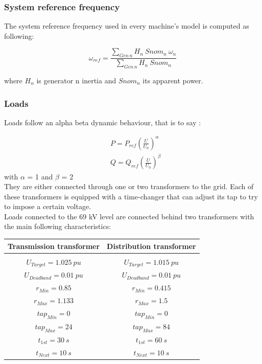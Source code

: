 \documentclass[a4paper, 12pt]{report}
\begin{document}
\subsubsection{System reference frequency}

The system reference frequency used in every machine's model is computed as following:

\[
 \omega_{ref} = \frac{\sum_{Gen \hspace{2pt} n} H_{n} \ Snom_{n} \ \omega_{n}}{\sum_{Gen \hspace{2pt} n} H_{n} \ Snom_{n}}
\]

where $H_{n}$ is generator n inertia and $Snom_{n}$ its apparent power.
\subsubsection{Loads}

Loads follow an alpha beta dynamic behaviour, that is to say :

\[
\begin{aligned}
& P = P_{ref} (\frac{U}{U_{0}})^\alpha \\
& Q = Q_{ref} (\frac{U}{U_{0}})^\beta
\end{aligned}
\]
with $\alpha$ = 1 and $\beta$ = 2 \\

They are either connected through one or two transformers to the grid. Each of these transformers is equipped with a time-changer that can adjust its tap to try to impose a certain voltage.  \\

Loads connected to the 69 kV level are connected behind two transformers with the main following characteristics:
\begin{center}
\begin{tabular}{c|c}
   \textbf{Transmission transformer} & \textbf{Distribution transformer}  \\
   \hline
   \\
   $U_{Target}=1.025 \ pu $ & $U_{Target}=1.015 \ pu $   \\
   $U_{Deadband}=0.01 \ pu $ & $U_{Deadband}=0.01 \ pu $   \\
   $r_{Min}=0.85 $ & $r_{Min}=0.415 $ \\
   $r_{Max}=1.133 $ & $r_{Max}=1.5 $ \\
   $tap_{Min}=0 $ & $tap_{Min}=0 $ \\
   $tap_{Max}=24 $ & $tap_{Max}=84 $ \\
   $t_{1st}=30 \ s $ & $t_{1st}=60 \ s $   \\
   $t_{Next}=10 \ s $ & $t_{Next}=10 \ s $   \\
\end{tabular}
\end{center}
\end{document}
